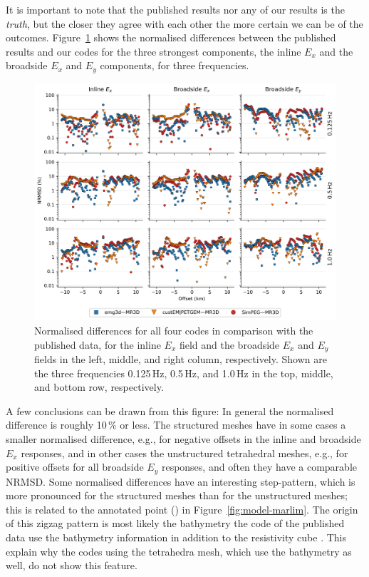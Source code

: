 \documentclass[extra, camera,%
]{gji}
\begin{document}
It is important to note that  the published results nor any of our results is the \emph{truth}, but the closer they agree with each other the more certain we can be of the outcomes.   Figure~\ref{fig:results-marlim_2published} shows the normalised differences between the published results and our codes for the three strongest components, the inline $E_x$ and the broadside $E_x$ and $E_y$ components, for three frequencies.
%
\begin{figure}
  \centering
  \includegraphics[width=.9\linewidth]{figures/results-marlim_2published.png}
  \caption{Normalised differences for all four codes in comparison with the published data, for the inline $E_x$ field and the broadside $E_x$ and $E_y$ fields in the left, middle, and right column, respectively. Shown are the three frequencies 0.125\,Hz, 0.5\,Hz, and 1.0\,Hz in the top, middle, and bottom row, respectively. }
  \label{fig:results-marlim_2published}
\end{figure}
%
A few conclusions can be drawn from this figure: In general the normalised difference is roughly 10\,\% or less. The structured meshes have in some cases a smaller normalised difference, e.g., for negative offsets in the inline and broadside $E_x$ responses, and in other cases the unstructured tetrahedral meshes, e.g., for positive offsets for all broadside $E_y$ responses, and often they have a comparable NRMSD. Some normalised differences have an interesting step-pattern, which is more pronounced for the structured meshes than for the unstructured meshes; this is related to the annotated point () in Figure~\ref{fig:model-marlim}. The origin of this zigzag pattern is most likely the bathymetry the code of the published data  use the bathymetry information in addition to the resistivity cube . This  explain why the codes using the tetrahedra mesh, which use the bathymetry as well, do not show this feature.
\end{document}
